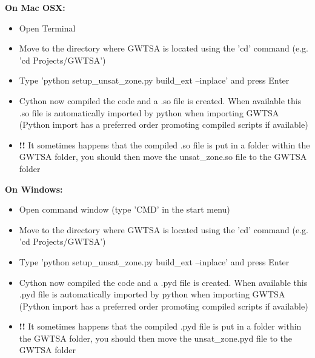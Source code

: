 \textbf{On Mac OSX:}
\begin{itemize} 
\item{Open Terminal}
\item{Move to the directory where GWTSA is located using the 'cd' command (e.g. 'cd Projects/GWTSA')}
\item{Type 'python setup\_unsat\_zone.py build\_ext --inplace' and press Enter}
\item{Cython now compiled the code and a .so file is created. When available this .so file is automatically imported by python when importing GWTSA (Python import has a preferred order promoting compiled scripts if available) }
\item{\textbf{!!} It sometimes happens that the compiled .so file is put in a folder within the GWTSA folder, you should then move the unsat\_zone.so file to the GWTSA folder}
\end{itemize}

\textbf{On Windows:}
\begin{itemize} 
\item{Open command window (type 'CMD' in the start menu)}
\item{Move to the directory where GWTSA is located using the 'cd' command (e.g. 'cd Projects/GWTSA')}
\item{Type 'python setup\_unsat\_zone.py build\_ext --inplace' and press Enter}
\item{Cython now compiled the code and a .pyd file is created. When available this .pyd file is automatically imported by python when importing GWTSA (Python import has a preferred order promoting compiled scripts if available) }
\item{\textbf{!!} It sometimes happens that the compiled .pyd file is put in a folder within the GWTSA folder, you should then move the unsat\_zone.pyd file to the GWTSA folder}
\end{itemize}